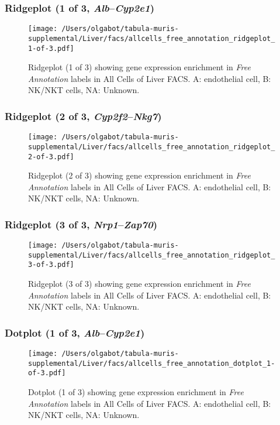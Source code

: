 \clearpage

\subsubsection{Ridgeplot (1 of 3, \emph{Alb}--\emph{Cyp2e1})}
\begin{figure}[h]
\centering
\texttt{[image: /Users/olgabot/tabula-muris-supplemental/Liver/facs/allcells\_free\_annotation\_ridgeplot\_1-of-3.pdf]}

\caption{ Ridgeplot (1 of 3)  showing gene expression enrichment in \emph{Free Annotation} labels in All Cells of Liver FACS. A: endothelial cell, B: NK/NKT cells, NA: Unknown.}
\end{figure}


\clearpage

\subsubsection{Ridgeplot (2 of 3, \emph{Cyp2f2}--\emph{Nkg7})}
\begin{figure}[h]
\centering
\texttt{[image: /Users/olgabot/tabula-muris-supplemental/Liver/facs/allcells\_free\_annotation\_ridgeplot\_2-of-3.pdf]}

\caption{ Ridgeplot (2 of 3)  showing gene expression enrichment in \emph{Free Annotation} labels in All Cells of Liver FACS. A: endothelial cell, B: NK/NKT cells, NA: Unknown.}
\end{figure}


\clearpage

\subsubsection{Ridgeplot (3 of 3, \emph{Nrp1}--\emph{Zap70})}
\begin{figure}[h]
\centering
\texttt{[image: /Users/olgabot/tabula-muris-supplemental/Liver/facs/allcells\_free\_annotation\_ridgeplot\_3-of-3.pdf]}

\caption{ Ridgeplot (3 of 3)  showing gene expression enrichment in \emph{Free Annotation} labels in All Cells of Liver FACS. A: endothelial cell, B: NK/NKT cells, NA: Unknown.}
\end{figure}


\clearpage

\subsubsection{Dotplot (1 of 3, \emph{Alb}--\emph{Cyp2e1})}
\begin{figure}[h]
\centering
\texttt{[image: /Users/olgabot/tabula-muris-supplemental/Liver/facs/allcells\_free\_annotation\_dotplot\_1-of-3.pdf]}

\caption{ Dotplot (1 of 3)  showing gene expression enrichment in \emph{Free Annotation} labels in All Cells of Liver FACS. A: endothelial cell, B: NK/NKT cells, NA: Unknown.}
\end{figure}


